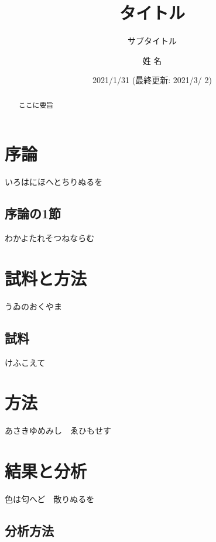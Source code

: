 \documentclass[
  pandoc,
  jafont = haranoaji,
  a4paper,
  everyparhook = compat,
  japaram = {units = true}]{bxjsarticle}
\title{タイトル}
\subtitle{サブタイトル}
\author{姓 名}
\date{2021/1/31 (最終更新: 2021/3/ 2)}
\begin{document}
\maketitle
\begin{abstract}
ここに要旨
\end{abstract}

{
\setcounter{tocdepth}{2}
\tableofcontents
}
\thispagestyle{empty}
\pagestyle{empty}

\hypertarget{ux5e8fux8ad6}{%
\section{序論}\label{ux5e8fux8ad6}}

いろはにほへとちりぬるを

\hypertarget{ux5e8fux8ad6ux306e1ux7bc0}{%
\subsection{序論の1節}\label{ux5e8fux8ad6ux306e1ux7bc0}}

わかよたれそつねならむ

\hypertarget{ux8a66ux6599ux3068ux65b9ux6cd5}{%
\section{試料と方法}\label{ux8a66ux6599ux3068ux65b9ux6cd5}}

うゐのおくやま

\hypertarget{ux8a66ux6599}{%
\subsection{試料}\label{ux8a66ux6599}}

けふこえて

\hypertarget{ux65b9ux6cd5}{%
\section{方法}\label{ux65b9ux6cd5}}

あさきゆめみし　ゑひもせす

\hypertarget{ux7d50ux679cux3068ux5206ux6790}{%
\section{結果と分析}\label{ux7d50ux679cux3068ux5206ux6790}}

色は匂へど　散りぬるを

\hypertarget{ux5206ux6790ux65b9ux6cd5}{%
\subsection{分析方法}\label{ux5206ux6790ux65b9ux6cd5}}
\end{document}
